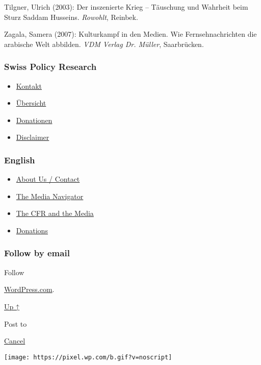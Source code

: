 Tilgner, Ulrich (2003): Der inszenierte Krieg -- Täuschung und Wahrheit
beim Sturz Saddam Husseins. \emph{Rowohlt}, Reinbek.

Zagala, Samera (2007): Kulturkampf in den Medien. Wie Fernsehnachrichten
die arabische Welt abbilden. \emph{VDM Verlag Dr. Müller}, Saarbrücken.

\hypertarget{swiss-policy-research}{%
\subsubsection{Swiss Policy Research}\label{swiss-policy-research}}

\begin{itemize}
\tightlist
\item
  \href{https://swprs.org/kontakt/}{Kontakt}
\item
  \href{https://swprs.org/uebersicht/}{Übersicht}
\item
  \href{https://swprs.org/donationen/}{Donationen}
\item
  \href{https://swprs.org/disclaimer/}{Disclaimer}
\end{itemize}

\hypertarget{english}{%
\subsubsection{English}\label{english}}

\begin{itemize}
\tightlist
\item
  \href{https://swprs.org/contact/}{About Us / Contact}
\item
  \href{https://swprs.org/media-navigator/}{The Media Navigator}
\item
  \href{https://swprs.org/the-american-empire-and-its-media/}{The CFR
  and the Media}
\item
  \href{https://swprs.org/donations/}{Donations}
\end{itemize}

\hypertarget{follow-by-email}{%
\subsubsection{Follow by email}\label{follow-by-email}}

Follow

\href{https://wordpress.com/?ref=footer_custom_com}{WordPress.com}.

\protect\hyperlink{}{Up ↑}

Post to

\protect\hyperlink{}{Cancel}

\texttt{[image: https://pixel.wp.com/b.gif?v=noscript]}
